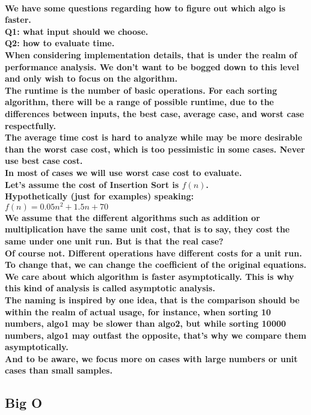 \documentclass{article}
\begin{document}
\paragraph{We have some questions regarding how to figure out which algo is faster.\\
Q1: what input should we choose.\\
Q2: how to evaluate time.\\
When considering implementation details, that is under the realm of performance analysis. We don't want to be bogged down to this level and only wish to focus on the algorithm.\\
The runtime is the number of basic operations. For each sorting algorithm, there will be a range of possible runtime, due to the differences between inputs, the best case, average case, and worst case respectfully.\\
The average time cost is hard to analyze while may be more desirable than the worst case cost, which is too pessimistic in some cases. Never use best case cost.\\
In most of cases we will use worst case cost to evaluate.\\
Let's assume the cost of Insertion Sort is $f(n)$.\\
Hypothetically (just for examples) speaking:\\
$ f(n) = 0.05n^2 + 1.5n +70 $\\
We assume that the different algorithms such as addition or multiplication have the same unit cost, that is to say, they cost the same under one unit run. But is that the real case?\\
Of course not. Different operations have different costs for a unit run. To change that, we can change the coefficient of the original equations.\\
We care about which algorithm is faster asymptotically. This is why this kind of analysis is called asymptotic analysis.\\
The naming is inspired by one idea, that is the comparison should be within the realm of actual usage, for instance, when sorting 10 numbers, algo1 may be slower than algo2, but while sorting 10000 numbers, algo1 may outfast the opposite, that's why we compare them asymptotically.\\
And to be aware, we focus more on cases with large numbers or unit cases than small samples.}

\subsection{Big O}
\end{document}
